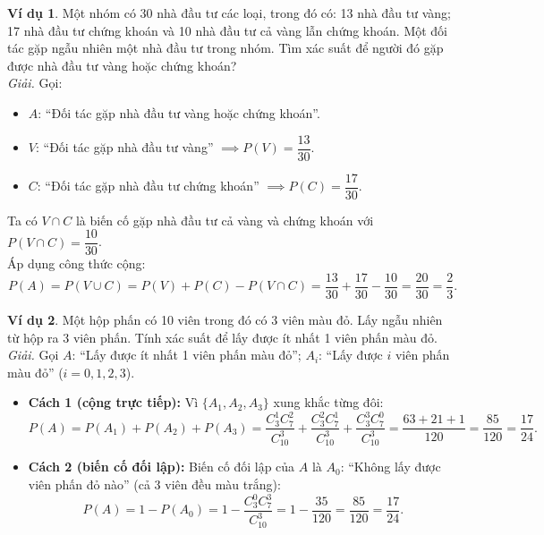 \documentclass[12pt,a4paper]{article}
\theoremstyle{definition}
\newtheorem{vidu}{Ví dụ}[section]
\begin{document}
\begin{vidu}
Một nhóm có 30 nhà đầu tư các loại, trong đó có: 13 nhà đầu tư vàng; 17 nhà đầu tư chứng khoán và 10 nhà đầu tư cả vàng lẫn chứng khoán. Một đối tác gặp ngẫu nhiên một nhà đầu tư trong nhóm. Tìm xác suất để người đó gặp được nhà đầu tư vàng hoặc chứng khoán?\\
\textit{Giải.} Gọi:
\begin{itemize}
    \item $A$: ``Đối tác gặp nhà đầu tư vàng hoặc chứng khoán''.
    \item $V$: ``Đối tác gặp nhà đầu tư vàng'' $\implies P(V) = \dfrac{13}{30}$.
    \item $C$: ``Đối tác gặp nhà đầu tư chứng khoán'' $\implies P(C) = \dfrac{17}{30}$.
\end{itemize}
Ta có $V \cap C$ là biến cố gặp nhà đầu tư cả vàng và chứng khoán với $P(V \cap C) = \dfrac{10}{30}$.\\
Áp dụng công thức cộng:
\[
P(A) = P(V \cup C) = P(V) + P(C) - P(V \cap C) = \frac{13}{30} + \frac{17}{30} - \frac{10}{30} = \frac{20}{30} = \frac{2}{3}.
\]
\end{vidu}

\begin{vidu}
Một hộp phấn có 10 viên trong đó có 3 viên màu đỏ. Lấy ngẫu nhiên từ hộp ra 3 viên phấn. Tính xác suất để lấy được ít nhất 1 viên phấn màu đỏ.\\
\textit{Giải.} Gọi $A$: ``Lấy được ít nhất 1 viên phấn màu đỏ''; $A_i$: ``Lấy được $i$ viên phấn màu đỏ'' ($i = 0, 1, 2, 3$).
\begin{itemize}
    \item \textbf{Cách 1 (cộng trực tiếp):} Vì $\{A_1, A_2, A_3\}$ xung khắc từng đôi:
    \[
    P(A) = P(A_1) + P(A_2) + P(A_3) = \frac{C_3^1 C_7^2}{C_{10}^3} + \frac{C_3^2 C_7^1}{C_{10}^3} + \frac{C_3^3 C_7^0}{C_{10}^3} = \frac{63 + 21 + 1}{120} = \frac{85}{120} = \frac{17}{24}.
    \]
    \item \textbf{Cách 2 (biến cố đối lập):} Biến cố đối lập của $A$ là $A_0$: ``Không lấy được viên phấn đỏ nào'' (cả 3 viên đều màu trắng):
    \[
    P(A) = 1 - P(A_0) = 1 - \frac{C_3^0 C_7^3}{C_{10}^3} = 1 - \frac{35}{120} = \frac{85}{120} = \frac{17}{24}.
    \]
\end{itemize}
\end{vidu}
\end{document}
